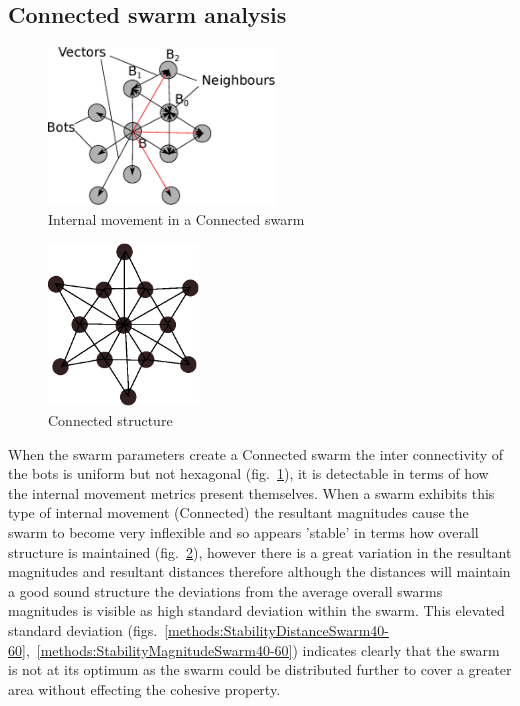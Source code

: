 \documentclass[10pt,journal,letterpaper,twoside]{IEEEtran}
\newcommand{\swarmB}{Connected}
\newcommand{\stability}{internal movement}
\newcommand{\Stability}{Internal movement}
\newcommand{\Fig}{fig.}
\newcommand{\Figs}{figs.}
\begin{document}
\subsection{\swarmB{} swarm analysis}

\begin{figure}[H]
\begin{center}
\includegraphics[width=6cm]{figures/CrushedStability}
\end{center}
\caption{\Stability{} in a \swarmB{} swarm} \label{methods:CrushedStability1}
\end{figure}

\begin{figure}[H]
\begin{center}
\includegraphics[width=4cm]{figures/StableFormsCompressed}
\end{center}
\caption{\swarmB{} structure} \label{methods:StableSwarmCompressed}
\end{figure}

When the swarm parameters create a \swarmB{} swarm the inter connectivity of the bots is uniform but not hexagonal (\Fig{}~\ref{methods:CrushedStability1}), it is detectable in terms of how the \stability{} metrics present themselves. When a swarm exhibits this type of \stability{} (\swarmB{}) the resultant magnitudes cause the swarm to become very inflexible and so appears 'stable' in terms how overall structure is maintained (\Fig{}~\ref{methods:StableSwarmCompressed}), however there is a great variation in the resultant magnitudes and resultant distances therefore although the distances will maintain a good sound structure the deviations from the average overall swarms magnitudes is visible as high standard deviation within the swarm.
This elevated standard deviation (\Figs{}~\ref{methods:StabilityDistanceSwarm40-60},~\ref{methods:StabilityMagnitudeSwarm40-60}) indicates clearly that the swarm is not at its optimum as the swarm could be distributed further to cover a greater area without effecting the cohesive property.
\end{document}
